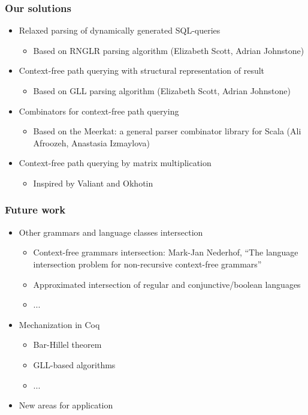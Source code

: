 \documentclass{beamer}
\begin{document}
\begin{frame}
  \transwipe[direction=90]
  \frametitle{Our solutions}
  \begin{itemize}
    \item Relaxed parsing of dynamically generated SQL-queries
    \begin{itemize}
        \item Based on RNGLR parsing algorithm (Elizabeth Scott, Adrian Johnstone)
    \end{itemize}
    \item Context-free path querying with structural representation of result
    \begin{itemize}
        \item Based on GLL parsing algorithm (Elizabeth Scott, Adrian Johnstone)
    \end{itemize}
    \item Combinators for context-free path querying
    \begin{itemize}
        \item Based on the Meerkat: a general parser combinator library for Scala (Ali Afroozeh, Anastasia Izmaylova)
    \end{itemize}
    \item Context-free path querying by matrix multiplication
    \begin{itemize}
        \item Inspired by Valiant and Okhotin
    \end{itemize}
  \end{itemize}
\end{frame}

\begin{frame}[fragile]
\transwipe[direction=90]
\frametitle{Future work}
\begin{itemize}
  \item Other grammars and language classes intersection
  \begin{itemize}
     \item Context-free grammars intersection: Mark-Jan Nederhof, ``The language intersection problem for non-recursive context-free grammars''
     \item Approximated intersection of regular and conjunctive/boolean languages
     \item ...
  \end{itemize}
  \item Mechanization in Coq
  \begin{itemize}
     \item Bar-Hillel theorem
     \item GLL-based algorithms
     \item ...
  \end{itemize}
  \item New areas for application
\end{itemize}
\end{frame}
            
\end{document}

